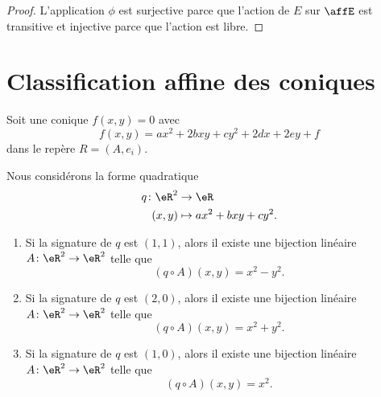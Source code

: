 \begin{proof}
	L'application \( \phi\) est surjective parce que l'action de \( E\) sur \( \affE\) est transitive et injective parce que l'action est libre.
\end{proof}

\section{Classification affine des coniques}

Soit une conique \( f(x,y)=0\) avec
\begin{equation}
	f(x,y)=ax^2+2bxy+cy^2+2dx+2ey+f
\end{equation}
dans le repère \( R=(A,e_i)\).

\begin{lemma}       \label{LEMooXZURooSVySRT}
	Nous considérons la forme quadratique
	\begin{equation}
		\begin{aligned}
			q\colon \eR^2 & \to \eR                   \\
			(x,y)         & \mapsto    ax^2+bxy+cy^2.
		\end{aligned}
	\end{equation}
	\begin{enumerate}
		\item
		      Si la signature de \( q\) est \( (1,1)\), alors il existe une bijection linéaire \(A \colon \eR^2\to \eR^2  \) telle que
		      \begin{equation}
			      (q\circ A)(x,y)=x^2-y^2.
		      \end{equation}
		\item
		      Si la signature de \( q\) est \( (2,0)\), alors il existe une bijection linéaire \(A \colon \eR^2\to \eR^2  \) telle que
		      \begin{equation}
			      (q\circ A)(x,y)=x^2+y^2.
		      \end{equation}
		\item
		      Si la signature de \( q\) est \( (1,0)\), alors il existe une bijection linéaire \(A \colon \eR^2\to \eR^2  \) telle que
		      \begin{equation}
			      (q\circ A)(x,y)=x^2.
		      \end{equation}
	\end{enumerate}
\end{lemma}

